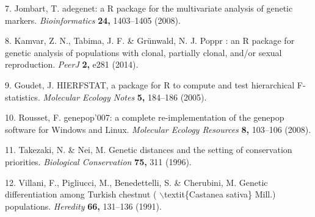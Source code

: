 \documentclass[12pt,a4paper,]{report}
\begin{document}
\leavevmode\hypertarget{ref-Jombart2008}{}%
7. Jombart, T. adegenet: a R package for the multivariate analysis of
genetic markers. \emph{Bioinformatics} \textbf{24,} 1403--1405 (2008).

\leavevmode\hypertarget{ref-Kamvar2014}{}%
8. Kamvar, Z. N., Tabima, J. F. \& Grünwald, N. J. Poppr : an R package
for genetic analysis of populations with clonal, partially clonal,
and/or sexual reproduction. \emph{PeerJ} \textbf{2,} e281 (2014).

\leavevmode\hypertarget{ref-Goudet2005}{}%
9. Goudet, J. HIERFSTAT, a package for R to compute and test
hierarchical F-statistics. \emph{Molecular Ecology Notes} \textbf{5,}
184--186 (2005).

\leavevmode\hypertarget{ref-Rousset2008}{}%
10. Rousset, F. genepop'007: a complete re-implementation of the genepop
software for Windows and Linux. \emph{Molecular Ecology Resources}
\textbf{8,} 103--106 (2008).

\leavevmode\hypertarget{ref-Takezaki1996}{}%
11. Takezaki, N. \& Nei, M. Genetic distances and the setting of
conservation priorities. \emph{Biological Conservation} \textbf{75,} 311
(1996).

\leavevmode\hypertarget{ref-Villani1991}{}%
12. Villani, F., Pigliucci, M., Benedettelli, S. \& Cherubini, M.
Genetic differentiation among Turkish chestnut (
\(\backslash\)textit\{Castanea sativa\} Mill.) populations.
\emph{Heredity} \textbf{66,} 131--136 (1991).
\end{document}
